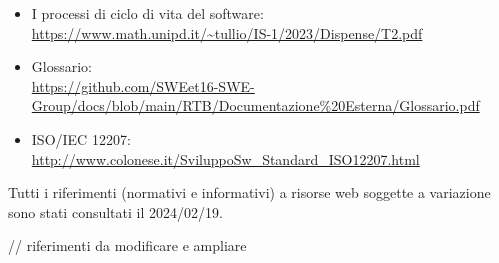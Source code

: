         \begin{itemize}
            \item I processi di ciclo di vita del software: \\
            \url{https://www.math.unipd.it/~tullio/IS-1/2023/Dispense/T2.pdf}
            \item Glossario: \\
            \url{https://github.com/SWEet16-SWE-Group/docs/blob/main/RTB/Documentazione%20Esterna/Glossario.pdf}
            \item ISO/IEC 12207: \\
            \url{http://www.colonese.it/SviluppoSw_Standard_ISO12207.html}
        \end{itemize}

        Tutti i riferimenti (normativi e informativi) a risorse web soggette a variazione sono stati consultati il 2024/02/19.


        // riferimenti da modificare e ampliare